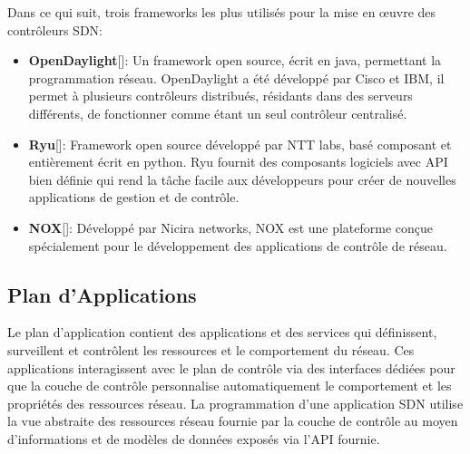 \noindent Dans ce qui suit, trois frameworks les plus utilisés pour la mise en œuvre des contrôleurs SDN:\\
\begin{itemize}
\item[]\textbf{OpenDaylight}[\cite{3}]: Un framework open source, écrit en java, permettant la programmation réseau. OpenDaylight a été développé par Cisco et IBM, il permet à plusieurs contrôleurs distribués, résidants dans des serveurs différents, de fonctionner comme étant un seul contrôleur centralisé.\\
\item[]\textbf{Ryu}[\cite{4}]: Framework open source développé par NTT labs, basé composant et entièrement écrit en python. Ryu fournit des composants logiciels avec API bien définie qui rend la tâche facile aux développeurs pour créer de nouvelles applications de gestion et de contrôle.\\
\item[]\textbf{NOX}[\cite{5}]: Développé par Nicira networks, NOX est une plateforme conçue spécialement pour le développement des applications de contrôle de réseau.
\end{itemize} 

\newpage
\subsection{Plan d'Applications}
Le plan d’application contient des applications et des services qui définissent, surveillent et contrôlent les ressources et le comportement du réseau. Ces applications interagissent avec le plan de contrôle via des interfaces dédiées pour que la couche de contrôle personnalise automatiquement le comportement et les propriétés des ressources réseau. La programmation d’une application SDN utilise la vue abstraite des ressources réseau fournie par la couche de contrôle au moyen d’informations et de modèles de données exposés via l’API fournie.

